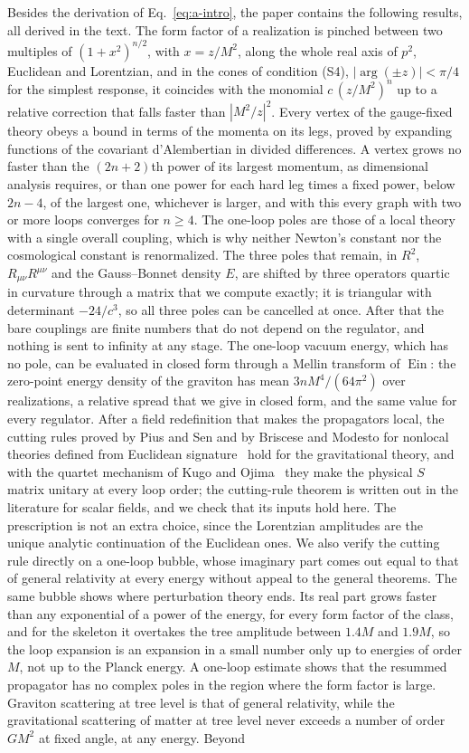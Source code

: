 \documentclass[a4paper,11pt]{article}
\newcommand{\Ein}{\operatorname{Ein}}
\begin{document}
Besides the derivation of Eq.~\eqref{eq:a-intro}, the paper contains the following results, all derived in the text. The form factor of a realization is pinched between two multiples of $(1+x^2)^{n/2}$, with $x=z/M^2$, along the whole real axis of $p^2$, Euclidean and Lorentzian, and in the cones of condition (S4), $|\arg(\pm z)|<\pi/4$ for the simplest response, it coincides with the monomial $c\,(z/M^2)^n$ up to a relative correction that falls faster than $|M^2/z|^{2}$. Every vertex of the gauge-fixed theory obeys a bound in terms of the momenta on its legs, proved by expanding functions of the covariant d'Alembertian in divided differences. A vertex grows no faster than the $(2n+2)$th power of its largest momentum, as dimensional analysis requires, or than one power for each hard leg times a fixed power, below $2n-4$, of the largest one, whichever is larger, and with this every graph with two or more loops converges for $n\ge4$. The one-loop poles are those of a local theory with a single overall coupling, which is why neither Newton's constant nor the cosmological constant is renormalized. The three poles that remain, in $R^2$, $R_{\mu\nu}R^{\mu\nu}$ and the Gauss--Bonnet density $E$, are shifted by three operators quartic in curvature through a matrix that we compute exactly; it is triangular with determinant $-24/c^3$, so all three poles can be cancelled at once. After that the bare couplings are finite numbers that do not depend on the regulator, and nothing is sent to infinity at any stage. The one-loop vacuum energy, which has no pole, can be evaluated in closed form through a Mellin transform of $\Ein$: the zero-point energy density of the graviton has mean $3nM^4/(64\pi^2)$ over realizations, a relative spread that we give in closed form, and the same value for every regulator. After a field redefinition that makes the propagators local, the cutting rules proved by Pius and Sen and by Briscese and Modesto for nonlocal theories defined from Euclidean signature~\cite{PiusSen2016,BrisceseModesto2019} hold for the gravitational theory, and with the quartet mechanism of Kugo and Ojima~\cite{KugoOjima1978} they make the physical $S$ matrix unitary at every loop order; the cutting-rule theorem is written out in the literature for scalar fields, and we check that its inputs hold here. The prescription is not an extra choice, since the Lorentzian amplitudes are the unique analytic continuation of the Euclidean ones. We also verify the cutting rule directly on a one-loop bubble, whose imaginary part comes out equal to that of general relativity at every energy without appeal to the general theorems. The same bubble shows where perturbation theory ends. Its real part grows faster than any exponential of a power of the energy, for every form factor of the class, and for the skeleton it overtakes the tree amplitude between $1.4M$ and $1.9M$, so the loop expansion is an expansion in a small number only up to energies of order $M$, not up to the Planck energy. A one-loop estimate shows that the resummed propagator has no complex poles in the region where the form factor is large. Graviton scattering at tree level is that of general relativity, while the gravitational scattering of matter at tree level never exceeds a number of order $GM^2$ at fixed angle, at any energy. Beyond 
\end{document}
